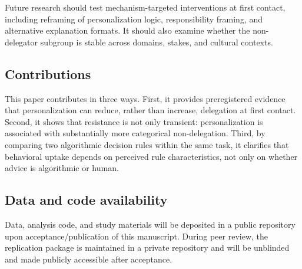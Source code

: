 \documentclass[a4paper, 12pt, fleqn]{article}
\theoremstyle{definition}
\begin{document}
Future research should test mechanism-targeted interventions at first contact, including reframing of personalization logic, responsibility framing, and alternative explanation formats. It should also examine whether the non-delegator subgroup is stable across domains, stakes, and cultural contexts.

\subsection{Contributions}
This paper contributes in three ways. First, it provides preregistered evidence that personalization can reduce, rather than increase, delegation at first contact. Second, it shows that resistance is not only transient: personalization is associated with substantially more categorical non-delegation. Third, by comparing two algorithmic decision rules within the same task, it clarifies that behavioral uptake depends on perceived rule characteristics, not only on whether advice is algorithmic or human.

\subsection{Data and code availability}
Data, analysis code, and study materials will be deposited in a public repository upon acceptance/publication of this manuscript. During peer review, the replication package is maintained in a private repository and will be unblinded and made publicly accessible after acceptance.


\newpage
\thispagestyle{plain}
\addtolength{\topmargin}{-.5cm}
\addtolength{\textheight}{.8cm}




 
\end{document}
